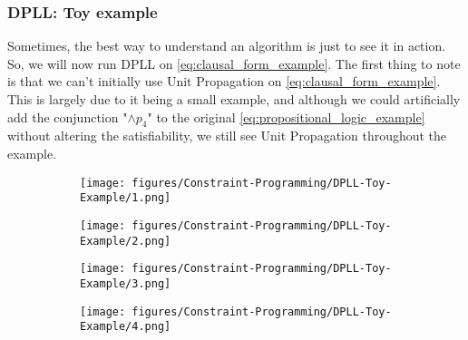 \subsubsection{DPLL: Toy example}
Sometimes, the best way to understand an algorithm is just to see it in action. So, we will now run DPLL on \autoref{eq:clausal_form_example}. The first thing to note is that we can't initially use Unit Propagation on \autoref{eq:clausal_form_example}. This is largely due to it being a small example, and although we could artificially add the conjunction "\(\wedge p_4\)" to the original \autoref{eq:propositional_logic_example} without altering the satisfiability, we still see Unit Propagation throughout the example.
\begin{figure}[H]
    \centering
    \begin{subfigure}[t]{0.45\textwidth}
        \centering
        \texttt{[image: figures/Constraint-Programming/DPLL-Toy-Example/1.png]}
    \end{subfigure}
    \begin{subfigure}[t]{0.45\textwidth}
        \centering
        \texttt{[image: figures/Constraint-Programming/DPLL-Toy-Example/2.png]}
    \end{subfigure}
\end{figure}

\begin{figure}[H]
    \centering
    \begin{subfigure}[t]{0.45\textwidth}
        \centering
        \texttt{[image: figures/Constraint-Programming/DPLL-Toy-Example/3.png]}
    \end{subfigure}
    \begin{subfigure}[t]{0.45\textwidth}
        \centering
        \texttt{[image: figures/Constraint-Programming/DPLL-Toy-Example/4.png]}
    \end{subfigure}
\end{figure}

